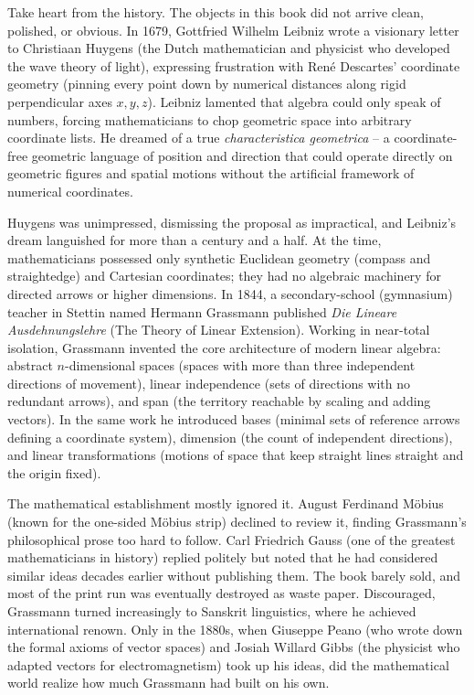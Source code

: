 \begin{historybox}
Take heart from the history. The objects in this book did not arrive clean, polished, or obvious.
In 1679, Gottfried Wilhelm Leibniz wrote a visionary letter to Christiaan Huygens (the Dutch
mathematician and physicist who developed the wave theory of light), expressing frustration
with René Descartes' coordinate geometry (pinning every point down by numerical distances along
rigid perpendicular axes $x, y, z$). Leibniz lamented that algebra could only speak of numbers,
forcing mathematicians to chop geometric space into arbitrary coordinate lists. He dreamed of a
true \emph{characteristica geometrica} -- a coordinate-free geometric language of position and
direction that could operate directly on geometric figures and spatial motions without the
artificial framework of numerical coordinates.

Huygens was unimpressed, dismissing the proposal as impractical, and Leibniz's dream languished
for more than a century and a half. At the time, mathematicians possessed only synthetic Euclidean
geometry (compass and straightedge) and Cartesian coordinates; they had no algebraic machinery for
directed arrows or higher dimensions. In 1844, a secondary-school (gymnasium) teacher in Stettin
named Hermann Grassmann published \emph{Die Lineare Ausdehnungslehre} (The Theory of Linear Extension).
Working in near-total isolation, Grassmann invented the core architecture of modern linear algebra:
abstract $n$-dimensional spaces (spaces with more than three independent directions of movement),
linear independence (sets of directions with no redundant arrows), and span (the territory
reachable by scaling and adding vectors). In the same work he introduced bases (minimal sets of
reference arrows defining a coordinate system), dimension (the count of independent directions),
and linear transformations (motions of space that keep straight lines straight and the origin fixed).

The mathematical establishment mostly ignored it. August Ferdinand Möbius (known
for the one-sided Möbius strip) declined to review it, finding Grassmann's philosophical prose
too hard to follow. Carl Friedrich Gauss (one of the greatest mathematicians in history) replied
politely but noted that he had considered similar ideas decades
earlier without publishing them. The book barely sold, and most of the print run was eventually
destroyed as waste paper. Discouraged, Grassmann turned increasingly to Sanskrit linguistics, where he
achieved international renown. Only in the 1880s, when Giuseppe Peano (who
wrote down the formal axioms of vector spaces) and Josiah Willard Gibbs (the physicist who adapted
vectors for electromagnetism) took up his ideas, did the mathematical world realize how much
Grassmann had built on his own.


\end{historybox}
